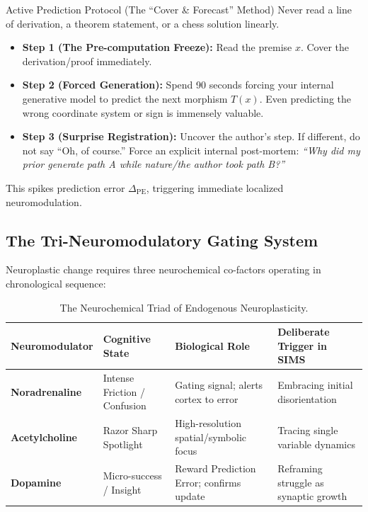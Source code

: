 \documentclass[11pt,a4paper]{article}
\begin{document}
\begin{principlebox}{Active Prediction Protocol (The ``Cover \& Forecast'' Method)}
Never read a line of derivation, a theorem statement, or a chess solution linearly.
\begin{itemize}
    \item \textbf{Step 1 (The Pre-computation Freeze):} Read the premise $x$. Cover the derivation/proof immediately.
    \item \textbf{Step 2 (Forced Generation):} Spend 90 seconds forcing your internal generative model to predict the next morphism $T(x)$. Even predicting the wrong coordinate system or sign is immensely valuable.
    \item \textbf{Step 3 (Surprise Registration):} Uncover the author's step. If different, do not say ``Oh, of course.'' Force an explicit internal post-mortem: \textit{``Why did my prior generate path A while nature/the author took path B?''}
\end{itemize}
This spikes prediction error $\Delta_{\text{PE}}$, triggering immediate localized neuromodulation.
\end{principlebox}

\subsection{The Tri-Neuromodulatory Gating System}
Neuroplastic change requires three neurochemical co-factors operating in chronological sequence:

\begin{table}[h!]
\centering
\small
\begin{tabular}{@{}llll@{}}
\toprule
\textbf{Neuromodulator} & \textbf{Cognitive State} & \textbf{Biological Role} & \textbf{Deliberate Trigger in SIMS} \\ \midrule
\textbf{Noradrenaline} & Intense Friction / Confusion & Gating signal; alerts cortex to error & Embracing initial disorientation \\
\textbf{Acetylcholine} & Razor Sharp Spotlight & High-resolution spatial/symbolic focus & Tracing single variable dynamics \\
\textbf{Dopamine} & Micro-success / Insight & Reward Prediction Error; confirms update & Reframing struggle as synaptic growth \\ \bottomrule
\end{tabular}
\caption{The Neurochemical Triad of Endogenous Neuroplasticity.}
\end{table}
\end{document}
